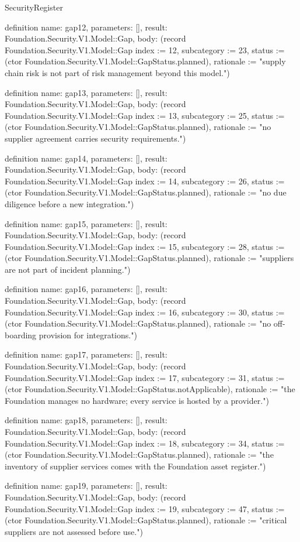 \begin{lexlean}{SecurityRegister}
\begin{semanticmodule}
definition{
  name: gap12,
  parameters: [],
  result: Foundation.Security.V1.Model::Gap,
  body: (record Foundation.Security.V1.Model::Gap {index := 12, subcategory := 23, status := (ctor Foundation.Security.V1.Model::GapStatus.planned), rationale := "supply chain risk is not part of risk management beyond this model."})
}

definition{
  name: gap13,
  parameters: [],
  result: Foundation.Security.V1.Model::Gap,
  body: (record Foundation.Security.V1.Model::Gap {index := 13, subcategory := 25, status := (ctor Foundation.Security.V1.Model::GapStatus.planned), rationale := "no supplier agreement carries security requirements."})
}

definition{
  name: gap14,
  parameters: [],
  result: Foundation.Security.V1.Model::Gap,
  body: (record Foundation.Security.V1.Model::Gap {index := 14, subcategory := 26, status := (ctor Foundation.Security.V1.Model::GapStatus.planned), rationale := "no due diligence before a new integration."})
}

definition{
  name: gap15,
  parameters: [],
  result: Foundation.Security.V1.Model::Gap,
  body: (record Foundation.Security.V1.Model::Gap {index := 15, subcategory := 28, status := (ctor Foundation.Security.V1.Model::GapStatus.planned), rationale := "suppliers are not part of incident planning."})
}

definition{
  name: gap16,
  parameters: [],
  result: Foundation.Security.V1.Model::Gap,
  body: (record Foundation.Security.V1.Model::Gap {index := 16, subcategory := 30, status := (ctor Foundation.Security.V1.Model::GapStatus.planned), rationale := "no off-boarding provision for integrations."})
}

definition{
  name: gap17,
  parameters: [],
  result: Foundation.Security.V1.Model::Gap,
  body: (record Foundation.Security.V1.Model::Gap {index := 17, subcategory := 31, status := (ctor Foundation.Security.V1.Model::GapStatus.notApplicable), rationale := "the Foundation manages no hardware; every service is hosted by a provider."})
}

definition{
  name: gap18,
  parameters: [],
  result: Foundation.Security.V1.Model::Gap,
  body: (record Foundation.Security.V1.Model::Gap {index := 18, subcategory := 34, status := (ctor Foundation.Security.V1.Model::GapStatus.planned), rationale := "the inventory of supplier services comes with the Foundation asset register."})
}

definition{
  name: gap19,
  parameters: [],
  result: Foundation.Security.V1.Model::Gap,
  body: (record Foundation.Security.V1.Model::Gap {index := 19, subcategory := 47, status := (ctor Foundation.Security.V1.Model::GapStatus.planned), rationale := "critical suppliers are not assessed before use."})
}


\end{semanticmodule}
\end{lexlean}
